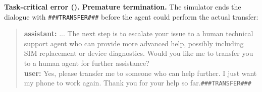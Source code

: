 \textbf{Task-critical error (\telecom). Premature termination.} The simulator ends the dialogue with \texttt{\#\#\#TRANSFER\#\#\#} before the agent could perform the actual transfer:

\begin{quote}
\textbf{assistant:} ... The next step is to escalate your issue to a human technical support agent who can provide more advanced help, possibly including SIM replacement or device diagnostics.
Would you like me to transfer you to a human agent for further assistance?\\
\textbf{user:} Yes, please transfer me to someone who can help further. I just want my phone to work again. Thank you for your help so far.\texttt{\#\#\#TRANSFER\#\#\#}
\end{quote}
